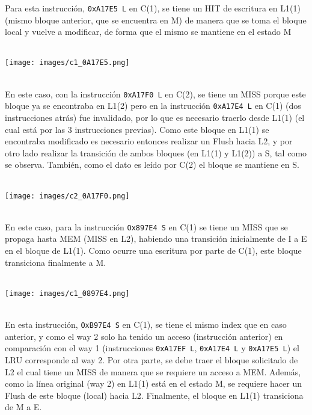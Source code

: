 \documentclass {article}
\begin{document}
Para esta instrucción, \texttt{0xA17E5 L} en C(1), se tiene un HIT de escritura en L1(1) (mismo
bloque anterior, que se encuentra en M) de manera que se toma el bloque local y vuelve a modificar,
de forma que el mismo se mantiene en el estado M
\\
\\
\begin{centering} \texttt{[image: images/c1\_0A17E5.png]} \end{centering}
\\
En este caso, con la instrucción \texttt{0xA17F0 L} en C(2), se tiene un MISS porque este bloque ya
se encontraba en L1(2) pero en la instrucción \texttt{0xA17E4 L} en C(1) (dos instrucciones atrás)
fue invalidado, por lo que es necesario traerlo desde L1(1) (el cual está por las 3 instrucciones
previas). Como este bloque en L1(1) se encontraba modificado es necesario entonces realizar un Flush
hacia L2, y por otro lado realizar la transición de ambos bloques (en L1(1) y L1(2)) a S, tal como
se observa. También, como el dato es leído por C(2) el bloque se mantiene en S.
\\
\\
\begin{centering} \texttt{[image: images/c2\_0A17F0.png]} \end{centering}
\\
En este caso, para la instrucción \texttt{Ox897E4 S} en C(1) se tiene un MISS que se propaga hasta
MEM (MISS en L2), habiendo una transición inicialmente de I a E en el bloque de L1(1). Como ocurre
una escritura por parte de C(1), este bloque transiciona finalmente a M.
\\
\\
\begin{centering} \texttt{[image: images/c1\_0897E4.png]} \end{centering}
\\
En esta instrucción, \texttt{OxB97E4 S} en C(1), se tiene el mismo index que en caso anterior, y
como el way 2 solo ha tenido un acceso (instrucción anterior) en comparación con el way 1
(instrucciones \texttt{0xA17EF L}, \texttt{0xA17E4 L} y \texttt{0xA17E5 L}) el LRU corresponde al
way 2. Por otra parte, se debe traer el bloque solicitado de L2 el cual tiene un MISS de manera que
se requiere un acceso a MEM. Además, como la línea original (way 2) en L1(1) está en el estado M, se
requiere hacer un Flush de este bloque (local) hacia L2. Finalmente, el bloque en L1(1)
transiciona de M a E.
\end{document}
